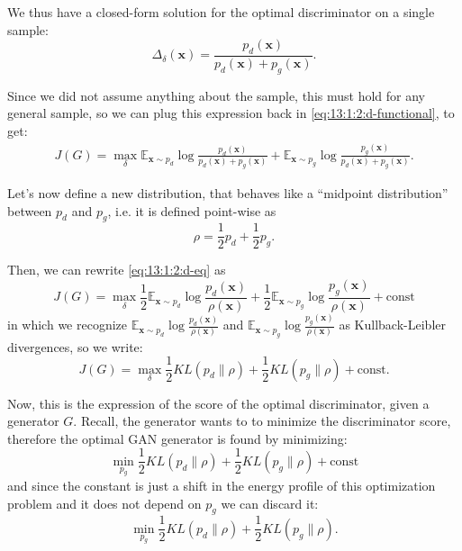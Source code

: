 We thus have a closed-form solution for the optimal discriminator on a single sample:
\begin{equation}
	\Delta_\delta(\mathbf{x}) = \frac{p_d(\mathbf{x})}{p_d(\mathbf{x}) + p_g(\mathbf{x})}.
\end{equation}

Since we did not assume anything about the sample, this must hold for any general sample, so we can plug this expression back in \cref{eq:13:1:2:d-functional}, to get:
\begin{align}
    J(G) = \max_\delta \mathbb{E}_{\mathbf{x} \sim p_d} \log \frac{p_d(\mathbf{x})}{p_d(\mathbf{x}) + p_g(\mathbf{x})} + \mathbb{E}_{\mathbf{x} \sim p_g} \log \frac{p_g(\mathbf{x})}{p_d(\mathbf{x}) + p_g(\mathbf{x})}.
    \label{eq:13:1:2:d-eq}
\end{align}

Let's now define a new distribution, that behaves like a ``midpoint distribution'' between $p_d$ and $p_g$, i.e. it is defined point-wise as
\begin{equation}
	\rho = \frac12p_d + \frac12p_g.
\end{equation}

Then, we can rewrite \cref{eq:13:1:2:d-eq} as
\begin{equation}
    J(G) = \max_\delta \frac12 \mathbb{E}_{\mathbf{x} \sim p_d} \log \frac{p_d(\mathbf{x})}{\rho(\mathbf{x})} + \frac12 \mathbb{E}_{\mathbf{x} \sim p_g} \log \frac{p_g(\mathbf{x})}{\rho(\mathbf{x})} + \mathrm{const}
\end{equation}
in which we recognize $\mathbb{E}_{\mathbf{x} \sim p_d} \log \frac{p_d(\mathbf{x})}{\rho(\mathbf{x})}$ and $\mathbb{E}_{\mathbf{x} \sim p_g} \log \frac{p_g(\mathbf{x})}{\rho(\mathbf{x})}$ as Kullback-Leibler divergences, so we write:
\begin{equation}
	J(G) = \max_\delta \frac12 KL(p_d \| \rho) + \frac12 KL(p_g \| \rho) + \mathrm{const}.
\end{equation}

Now, this is the expression of the score of the optimal discriminator, given a generator $G$. Recall, the generator wants to to minimize the discriminator score, therefore the optimal GAN generator is found by minimizing:
\begin{equation}
	\min_{p_g} \frac12 KL(p_d \| \rho) + \frac12 KL(p_g \| \rho) + \mathrm{const}
\end{equation}
and since the constant is just a shift in the energy profile of this optimization problem and it does not depend on $p_g$ we can discard it:
\begin{equation}
    \min_{p_g} \frac12 KL(p_d \| \rho) + \frac12 KL(p_g \| \rho).
    \label{eq:13:1:2:g-objective}
\end{equation}

